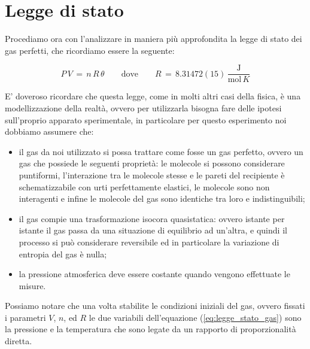 \section{Legge di stato}

Procediamo ora con l'analizzare in maniera più approfondita la legge di stato dei gas perfetti, che ricordiamo essere la seguente:

\begin{equation*}
    P \, V \,=\, n \, R \, \theta \quad\quad \text{dove} \quad\quad R \,=\, 8.31472(15) \, \frac{\text{J}}{\text{mol} \, K}
\end{equation*}

E' doveroso ricordare che questa legge, come in molti altri casi della fisica, è una modellizzazione della realtà, ovvero per utilizzarla bisogna fare delle ipotesi sull'proprio apparato sperimentale, in particolare per questo esperimento noi dobbiamo assumere che:

\begin{itemize}
	\item{il gas da noi utilizzato si possa trattare come fosse un gas perfetto, ovvero un gas che possiede le seguenti proprietà: le molecole si possono considerare puntiformi, l'interazione tra le molecole stesse e le pareti del recipiente è schematizzabile con urti perfettamente elastici, le molecole sono non interagenti e infine le molecole del gas sono identiche tra loro e indistinguibili;}
	\item{il gas compie una trasformazione isocora quasistatica: ovvero istante per istante il gas passa da una situazione di equilibrio ad un'altra, e quindi il processo si può considerare reversibile ed in particolare la variazione di entropia del gas è nulla;}
	\item{la pressione atmosferica deve essere costante quando vengono effettuate le misure.}
\end{itemize}
%
Possiamo notare che una volta stabilite le condizioni iniziali del gas, ovvero fissati i parametri $V$, $n$, ed $R$ le due variabili dell'equazione (\ref{eq:legge_stato_gas}) sono la pressione e la temperatura che sono legate da un rapporto di proporzionalità diretta. 

